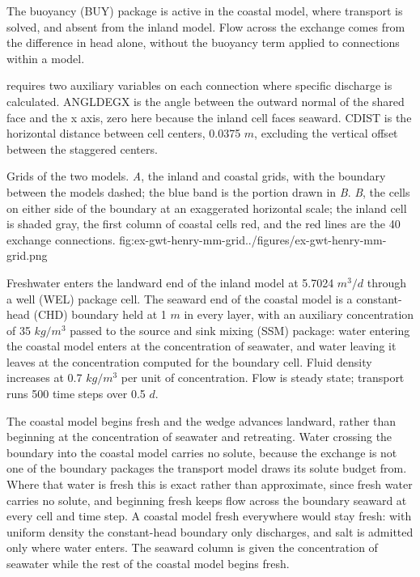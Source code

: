 The buoyancy (BUY) package is active in the coastal model, where transport is solved, and absent from the inland model. Flow across the exchange comes from the difference in head alone, without the buoyancy term applied to connections within a model.

\mf requires two auxiliary variables on each connection where specific discharge is calculated. ANGLDEGX is the angle between the outward normal of the shared face and the x axis, zero here because the inland cell faces seaward. CDIST is the horizontal distance between cell centers, 0.0375 $m$, excluding the vertical offset between the staggered centers.



\begin{StandardFigure}{
    Grids of the two models. \textit{A}, the inland and coastal grids, with the
    boundary between the models dashed; the blue band is the portion drawn in
    \textit{B}. \textit{B}, the cells on either side of the boundary at an
    exaggerated horizontal scale; the inland cell is shaded gray, the first column of
    coastal cells red, and the red lines are the 40 exchange connections.
    }{fig:ex-gwt-henry-mm-grid}{../figures/ex-gwt-henry-mm-grid.png}
\end{StandardFigure}

Freshwater enters the landward end of the inland model at 5.7024 $m^3/d$ through a well (WEL) package cell. The seaward end of the coastal model is a constant-head (CHD) boundary held at 1 $m$ in every layer, with an auxiliary concentration of 35 $kg/m^3$ passed to the source and sink mixing (SSM) package: water entering the coastal model enters at the concentration of seawater, and water leaving it leaves at the concentration computed for the boundary cell. Fluid density increases at 0.7 $kg/m^3$ per unit of concentration. Flow is steady state; transport runs 500 time steps over 0.5 $d$.

The coastal model begins fresh and the wedge advances landward, rather than beginning at the concentration of seawater and retreating. Water crossing the boundary into the coastal model carries no solute, because the exchange is not one of the boundary packages the transport model draws its solute budget from. Where that water is fresh this is exact rather than approximate, since fresh water carries no solute, and beginning fresh keeps flow across the boundary seaward at every cell and time step. A coastal model fresh everywhere would stay fresh: with uniform density the constant-head boundary only discharges, and salt is admitted only where water enters. The seaward column is given the concentration of seawater while the rest of the coastal model begins fresh.

